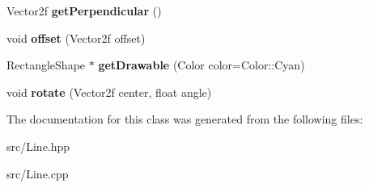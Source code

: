 \begin{DoxyCompactItemize}
Vector2f {\bfseries get\+Perpendicular} ()
\item 
\mbox{\label{class_line_afa01770fb4ff6266ae8454fbed9f1650}} 
void {\bfseries offset} (Vector2f offset)
\item 
\mbox{\label{class_line_a1bd25ca4caf671c99dbfa20c0aa32f27}} 
Rectangle\+Shape $\ast$ {\bfseries get\+Drawable} (Color color=Color\+::\+Cyan)
\item 
\mbox{\label{class_line_a1f12eb00fab756fb01962e1307b369a8}} 
void {\bfseries rotate} (Vector2f center, float angle)
\end{DoxyCompactItemize}


The documentation for this class was generated from the following files\+:\begin{DoxyCompactItemize}
\item 
src/Line.\+hpp\item 
src/Line.\+cpp\end{DoxyCompactItemize}
